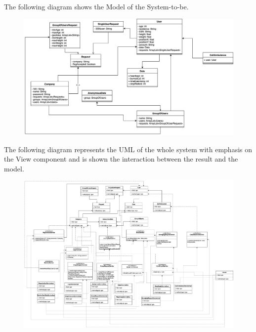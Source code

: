 \documentclass{article}
\begin{document}
The following diagram shows the Model of the System-to-be. 
\begin{figure}[h!]
\centering
    \textbf{}\par\medskip
	\includegraphics[width= \linewidth]{model.png}
\end{figure}
\newpage
The following diagram represents the UML of the whole system with emphasis on the View component and is shown the interaction between the result and the model.
\begin{figure}[h!]
\centering
    \textbf{}\par\medskip
	\includegraphics[width= \linewidth]{UMLbig.png}
\end{figure}
\newpage
\end{document}
